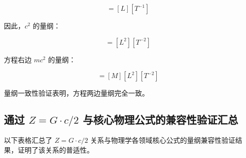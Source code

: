 \documentclass[12pt,a4paper]{article}
\begin{document}
\begin{equation}
[c] = [L][T^{-1}]
\label{eq:light_speed_dimension}
\end{equation}

因此，$c^2$ 的量纲：

\begin{equation}
[c^2] = [L^2][T^{-2}]
\label{eq:light_speed_squared_dimension}
\end{equation}

方程右边 $m c^2$ 的量纲：

\begin{equation}
[m c^2] = [M] [L^2][T^{-2}]
\label{eq:mass_light_speed_squared_dimension}
\end{equation}

量纲一致性验证表明，方程两边量纲完全一致。

\subsection{通过 $Z = G \cdot c / 2$ 与核心物理公式的兼容性验证汇总}
\label{subsection:core_physical_formula_compatibility}

以下表格汇总了 $Z = G \cdot c / 2$ 关系与物理学各领域核心公式的量纲兼容性验证结果，证明了该关系的普适性。
\end{document}
